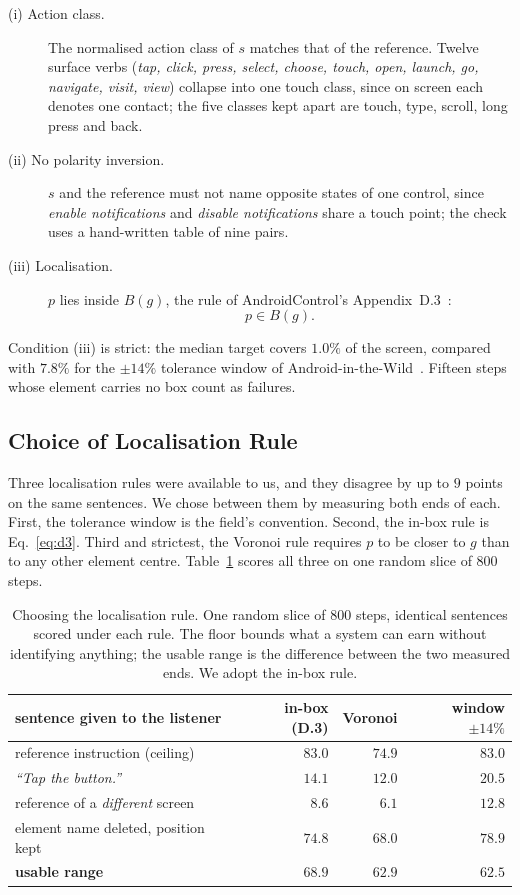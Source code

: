 \documentclass[runningheads,a4paper]{llncs}
\begin{document}
\begin{description}
\item[(i) Action class.] The normalised action class of $s$ matches that of the reference. Twelve
surface verbs (\emph{tap, click, press, select, choose, touch, open, launch, go, navigate, visit,
view}) collapse into one touch class, since on screen each denotes one contact; the five classes
kept apart are touch, type, scroll, long press and back.
\item[(ii) No polarity inversion.] $s$ and the reference must not name opposite states of one
control, since \emph{enable notifications} and \emph{disable notifications} share a touch point;
the check uses a hand-written table of nine pairs.
\item[(iii) Localisation.] $p$ lies inside $B(g)$, the rule of AndroidControl's
Appendix~D.3~\cite{androidcontrol}:
\begin{equation}
p \in B(g) .
\label{eq:d3}
\end{equation}
\end{description}

Condition (iii) is strict: the median target covers $1.0\%$ of the screen, compared with $7.8\%$
for the $\pm14\%$ tolerance window of Android-in-the-Wild~\cite{aitw}. Fifteen steps whose
element carries no box count as failures.

\subsection{Choice of Localisation Rule}
\label{sec:rules}

Three localisation rules were available to us, and they disagree by up to $9$ points on the same
sentences. We chose between them by measuring both ends of each. First, the tolerance
window is the field's convention. Second, the in-box rule is Eq.~\ref{eq:d3}. Third and
strictest, the Voronoi rule requires $p$ to be closer to $g$ than to any other element centre.
Table~\ref{tab:rules} scores all three on one random slice of $800$ steps.

\begin{table}[t]
\centering
\caption{Choosing the localisation rule. One random slice of $800$ steps, identical sentences
scored under each rule. The floor bounds what a system can earn without identifying anything;
the usable range is the difference between the two measured ends. We adopt the in-box rule.}
\label{tab:rules}
\begin{tabular}{lrrr}
\toprule
sentence given to the listener & in-box (D.3) & Voronoi & window $\pm14\%$\\
\midrule
reference instruction (ceiling) & $83.0$ & $74.9$ & $83.0$\\
\midrule
\emph{``Tap the button.''} & $14.1$ & $12.0$ & $20.5$\\
reference of a \emph{different} screen & $8.6$ & $6.1$ & $12.8$\\
element name deleted, position kept & $74.8$ & $68.0$ & $78.9$\\
\midrule
\textbf{usable range} & $\mathbf{68.9}$ & $62.9$ & $62.5$\\
\bottomrule
\end{tabular}
\end{table}
\end{document}
